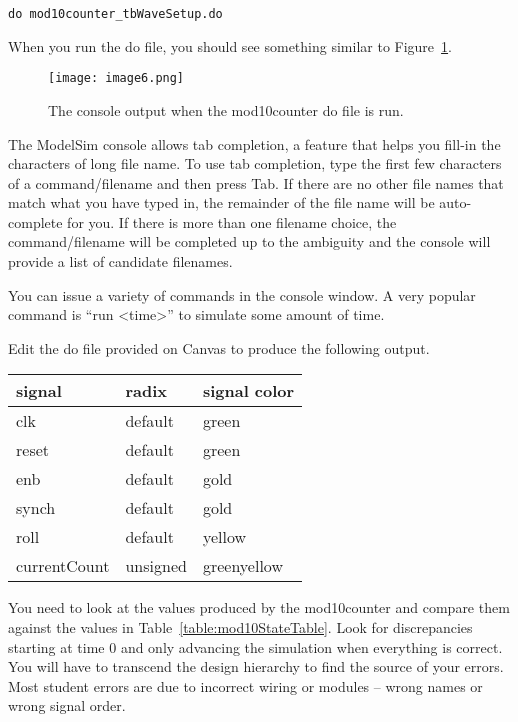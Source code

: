 \begin{verbatim}
do mod10counter_tbWaveSetup.do
\end{verbatim}

When you run the do file, you should see something similar to Figure~\ref{fig:mod10console}.

\begin{figure}[ht]
\texttt{[image: image6.png]}
\caption{The console output when the mod10counter do file is run.}
\label{fig:mod10console}
\end{figure}

The ModelSim console allows tab completion, a feature that helps you
fill-in the characters of long file name. To use tab completion, type
the first few characters of a command/filename and then press Tab. If
there are no other file names that match what you have typed in, the
remainder of the file name will be auto-complete for you. If there is
more than one filename choice, the command/filename will be completed up
to the ambiguity and the console will provide a list of candidate
filenames.

You can issue a variety of commands in the console window.   A very popular
command is ``run \textless time\textgreater'' to simulate some amount
of time. 


Edit the do file provided on Canvas to produce the following output.
\hypertarget{link:mod10DoFile}{}{}

\begin{tabular}{p{3cm}p{3cm}p{3cm}}
signal & radix & signal color \\ \hline
  clk 		& default 		& green  \\ 
  reset 	& default 		& green  \\ 
  enb 		& default 		& gold  \\ 
  synch 	& default 		& gold  \\ 
  roll 		& default 		& yellow  \\ 
  currentCount 	& unsigned & greenyellow  \\ 
\end{tabular}

You need to look at the values produced by the mod10counter and compare
them against the values in Table~\ref{table:mod10StateTable}. Look for discrepancies
starting at time 0 and only advancing the simulation when everything is
correct. You will have to transcend the design hierarchy to find the
source of your errors. Most student errors are due to incorrect wiring or
modules -- wrong names or wrong signal order.


